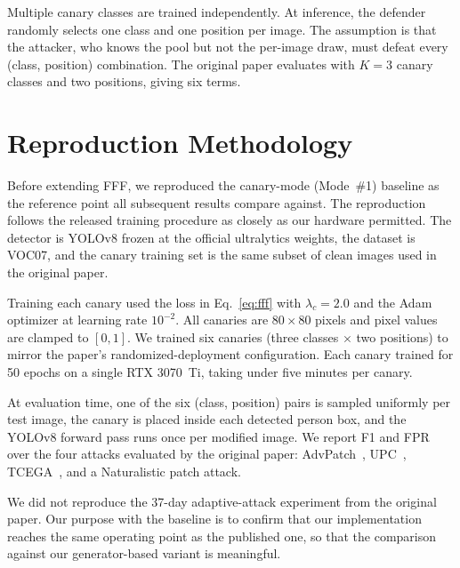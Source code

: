 \documentclass[conference]{IEEEtran}
\begin{document}
Multiple canary classes are trained independently. At inference, the
defender randomly selects one class and one position per image. The
assumption is that the attacker, who knows the pool but not the per-image
draw, must defeat every (class, position) combination. The original
paper evaluates with $K{=}3$ canary classes and two positions, giving
six terms.

\section{Reproduction Methodology}
\label{sec:repro_method}

Before extending FFF, we reproduced the canary-mode (Mode~\#1) baseline as
the reference point all subsequent results compare against. The
reproduction follows the released training procedure as closely as our
hardware permitted. The detector is YOLOv8 frozen at the official
ultralytics weights, the dataset is VOC07, and the canary training set is
the same subset of clean images used in the original paper.

Training each canary used the loss in Eq.~\eqref{eq:fff} with
$\lambda_c{=}2.0$ and the Adam optimizer at learning rate $10^{-2}$. All
canaries are $80\times80$ pixels and pixel values are clamped to $[0,1]$.
We trained six canaries (three classes $\times$ two positions) to mirror
the paper's randomized-deployment configuration. Each canary trained for
50 epochs on a single RTX 3070~Ti, taking under five minutes per canary.

At evaluation time, one of the six (class, position) pairs is sampled
uniformly per test image, the canary is placed inside each detected
person box, and the YOLOv8 forward pass runs once per modified image. We
report F1 and FPR over the four attacks evaluated by the original paper:
AdvPatch~\cite{thys2019fooling}, UPC~\cite{huang2020upc},
TCEGA~\cite{hu2022tcega}, and a Naturalistic patch attack.

We did not reproduce the 37-day adaptive-attack experiment from the
original paper. Our purpose with the baseline is to confirm that our
implementation reaches the same operating point as the published one, so
that the comparison against our generator-based variant is meaningful.

\end{document}
